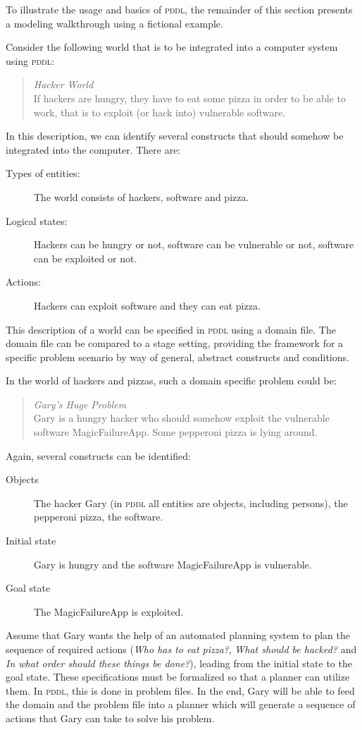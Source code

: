 \documentclass[a4paper,12pt]{report}
\begin{document}
To illustrate the usage and basics of \textsc{pddl}, the remainder of
this section presents a modeling walkthrough using a fictional
example.

Consider the following world that is to be integrated into a computer
system using \textsc{pddl}:

\begin{quote}
\emph{Hacker World} \\
If hackers are hungry, they have to eat some pizza in order to be able
to work, that is to exploit (or hack into) vulnerable software.
\end{quote}
In this description, we can identify several constructs that should
somehow be integrated into the computer. There are:

\begin{description}
\item[{Types of entities: }] The world consists of hackers, software and
pizza.
\item[{Logical states:}] Hackers can be hungry or not, software can be
vulnerable or not, software can be exploited or not.
\item[{Actions:}] Hackers can exploit software and they can eat pizza.
\end{description}
This description of a world can be specified in \textsc{pddl} using a
domain file. The domain file can be compared to a stage setting,
providing the framework for a specific problem scenario by way of
general, abstract constructs and conditions.

In the world of hackers and pizzas, such a domain specific problem
could be:

\begin{quote}
\emph{Gary's Huge Problem} \\
Gary is a hungry hacker who should somehow exploit the vulnerable
software MagicFailureApp. Some pepperoni pizza is lying around.
\end{quote}
Again, several constructs can be identified:

\begin{description}
\item[{Objects}] The hacker Gary (in \textsc{pddl} all entities are
objects, including persons), the pepperoni pizza, the
software.

\item[{Initial state}] Gary is hungry and the software MagicFailureApp
is vulnerable.

\item[{Goal state}] The MagicFailureApp is exploited.
\end{description}
Assume that Gary wants the help of an automated planning system to
plan the sequence of required actions (\emph{Who has to eat pizza?}, \emph{What
should be hacked?} and \emph{In what order should these things be done?}),
leading from the initial state to the goal state. These specifications
must be formalized so that a planner can utilize them. In
\textsc{pddl}, this is done in problem files. In the end, Gary will be
able to feed the domain and the problem file into a planner which will
generate a sequence of actions that Gary can take to solve his
problem.
\end{document}
